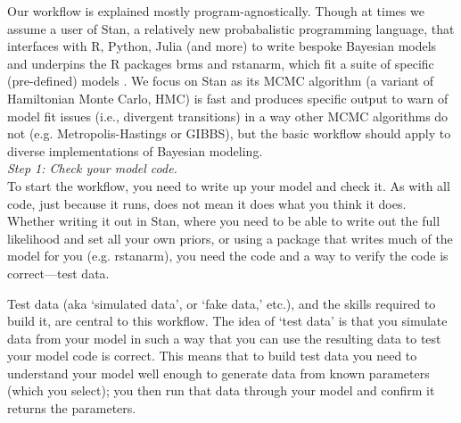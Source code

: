 \documentclass[11pt]{article}
\begin{document}
{Our workflow is explained mostly program-agnostically. Though at times we assume a user of \textsf{Stan}, a relatively new probabalistic programming language, that interfaces with \textsf{R, Python, Julia} (and more) to write bespoke Bayesian models and underpins the \textsf{R} packages \textsf{brms} and \textsf{rstanarm}, which fit a suite of specific (pre-defined) models \citep{Carpenter:2017stan}. We focus on \textsf{Stan} as its MCMC algorithm (a variant of Hamiltonian Monte Carlo, HMC) is fast and produces specific output to warn of model fit issues (i.e., divergent transitions) in a way other MCMC algorithms do not (e.g. Metropolis-Hastings or GIBBS), but the basic workflow should apply to diverse implementations of Bayesian modeling. \\

\emph{Step 1: Check your model code.} \\ 
To start the workflow, you need to write up your model and check it. As with all code, just because it runs, does not mean it does what you think it does. Whether writing it out in \textsf{Stan}, where you need to be able to write out the full likelihood and set all your own priors, or using a package that writes much of the model for you (e.g. \textsf{rstanarm}), you need the code and a way to verify the code is correct---test data.

Test data (aka `simulated data', or  `fake data,' etc.), and the skills required to build it, are central to this workflow. The idea of `test data' is that you simulate data from your model in such a way that you can use the resulting data to test your model code is correct. This means that to build test data you need to understand your model well enough to generate data from known parameters (which you select); you then run that data through your model and confirm it returns the parameters. %

}
\end{document}
